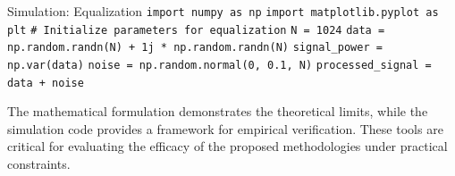 \begin{pythonbox}{Simulation: Equalization}
\texttt{import numpy as np}
\texttt{import matplotlib.pyplot as plt}
\texttt{}
\texttt{\# Initialize parameters for equalization}
\texttt{N = 1024}
\texttt{data = np.random.randn(N) + 1j * np.random.randn(N)}
\texttt{signal\_power = np.var(data)}
\texttt{noise = np.random.normal(0, 0.1, N)}
\texttt{processed\_signal = data + noise}
\end{pythonbox}

\vspace{0.5cm}
The mathematical formulation demonstrates the theoretical limits, while the simulation code provides a framework for empirical verification. These tools are critical for evaluating the efficacy of the proposed methodologies under practical constraints.

